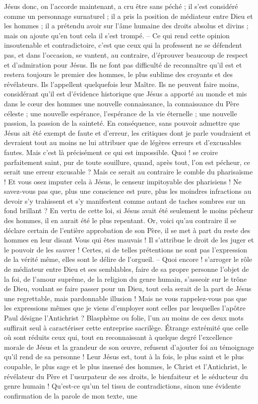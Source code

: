 Jésus donc, on l’accorde maintenant, a cru être sans péché ; il s’est considéré comme un personnage surnaturel ; il a pris la position de médiateur entre Dieu et les hommes ; il a prétendu avoir sur l’âme humaine des droits absolus et divins ; mais on ajoute qu’en tout cela il s’est trompé. – Ce qui rend cette opinion insoutenable et contradictoire, c’est que ceux qui la professent ne se défendent pas, et dans l’occasion, se vantent, au contraire, d’éprouver beaucoup de respect et d’admiration pour Jésus. Ils ne font pas difficulté de reconnaître qu’il est et restera toujours le premier des hommes, le plus sublime des croyants et des révélateurs. Ils l’appellent quelquefois leur Maître. Ils ne peuvent faire moins, considérant qu’il est d’évidence historique que Jésus a apporté au monde et mis dans le cœur des hommes une nouvelle connaissance, la connaissance du Père céleste ; une nouvelle espérance, l’espérance de la vie éternelle ; une nouvelle passion, la passion de la sainteté. En conséquence, sans pouvoir admettre que Jésus ait été exempt de faute et d’erreur, les critiques dont je parle voudraient et devraient tout au moins ne lui attribuer que de légères erreurs et d’excusables fautes. Mais c’est là précisément ce qui est impossible. Quoi ! se croire parfaitement saint, pur de toute souillure, quand, après tout, l’on est pécheur, ce serait une erreur excusable ? Mais ce serait au contraire le comble du pharisaïsme ! Et vous osez imputer cela à Jésus, le censeur impitoyable des pharisiens ! Ne savez-vous pas que, plus une conscience est pure, plus les moindres infractions au devoir s’y trahissent et s’y manifestent comme autant de taches sombres sur un fond brillant ? En vertu de cette loi, si Jésus avait été seulement le moins pécheur des hommes, il en aurait été le plus repentant. Or, voici qu’au contraire il se déclare certain de l’entière approbation de son Père, il se met à part du reste des hommes en leur disant\frcolon{} \Og{} Vous qui êtes mauvais !\Fg{} Il s’attribue le droit de les juger et le pouvoir de les sauver ! Certes, si de telles prétentions ne sont pas l’expression de la vérité même, elles sont le délire de l’orgueil. – Quoi encore ! s’arroger le rôle de médiateur entre Dieu et ses semblables, faire de sa propre personne l’objet de la foi, de l’amour suprême, de la religion du genre humain, s’asseoir sur le trône de Dieu, voulant se faire passer pour un Dieu, tout cela serait de la part de Jésus une regrettable, mais pardonnable illusion ! Mais ne vous rappelez-vous pas que les expressions mêmes que je viens d’employer sont celles par lesquelles l’apôtre Paul désigne l’Antichrist ? Blasphème ou folie, l’un au moins de ces deux mots suffirait seul à caractériser cette entreprise sacrilège. Étrange extrémité que celle où sont réduits ceux qui, tout en reconnaissant à quelque degré l’excellence morale de Jésus et la grandeur de son œuvre, refusent d’ajouter foi au témoignage qu’il rend de sa personne ! Leur Jésus est, tout à la fois, le plus saint et le plus coupable, le plus sage et le plus insensé des hommes, le Christ et l’Antichrist, le révélateur du Père et l’usurpateur de ses droits, le bienfaiteur et le séducteur du genre humain ! Qu’est-ce qu’un tel tissu de contradictions, sinon une évidente confirmation de la parole de mon texte, une 